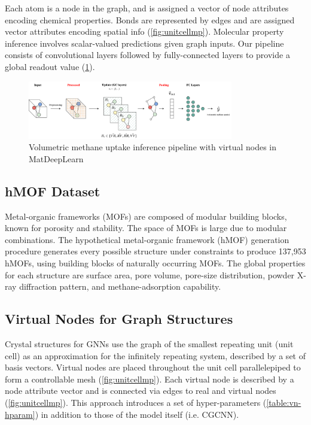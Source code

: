 \documentclass{lxaiproposal}
\begin{document}
Each atom is a node in the graph, and is assigned a vector of node attributes encoding chemical properties. Bonds are represented by edges and are assigned vector attributes encoding spatial info (\ref{fig:unitcellmp}). Molecular property inference involves scalar-valued predictions given graph inputs. Our pipeline consists of convolutional layers followed by fully-connected layers to provide a global readout value (\ref{fig:pipeline}).

\begin{figure}
    \centering
    \includegraphics[width=0.8\textwidth]{mdl-vn-pipeline.drawio.png}
    \caption{Volumetric methane uptake inference pipeline with virtual nodes in MatDeepLearn\cite{fung2021benchmarking}}
    \label{fig:pipeline}
\end{figure}

\subsection*{hMOF Dataset}

Metal-organic frameworks (MOFs) are composed of modular building blocks, known for porosity and stability. The space of  MOFs is large due to modular combinations. The hypothetical metal-organic framework (hMOF) generation procedure generates every possible structure under constraints to produce 137,953 hMOFs, using building blocks of naturally occurring MOFs. The global properties for each structure are surface area, pore volume, pore-size distribution, powder X-ray diffraction pattern, and methane-adsorption capability\cite{wilmer2012large}.

\subsection*{Virtual Nodes for Graph Structures}

Crystal structures for GNNs use the graph of the smallest repeating unit (unit cell) as an approximation for the infinitely repeating system, described by a set of basis vectors. Virtual nodes are placed throughout the unit cell parallelepiped to form a controllable mesh (\ref{fig:unitcellmp}). Each virtual node is described by a node attribute vector and is connected via edges to real and virtual nodes (\ref{fig:unitcellmp}). This approach introduces a set of hyper-parameters (\ref{table:vn-hparam}) in addition to those of the model itself (i.e. CGCNN).
\end{document}
